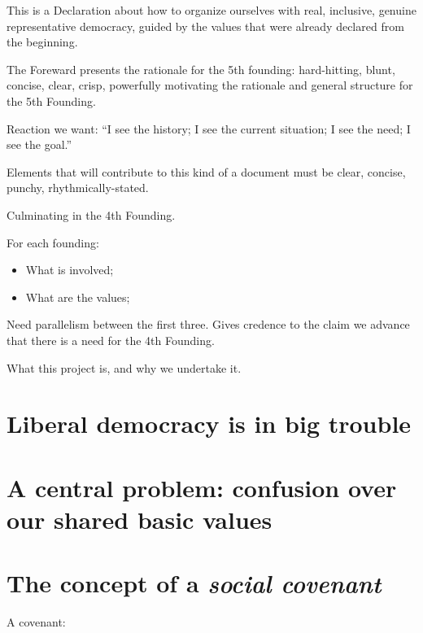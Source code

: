 \documentclass[
]{book}
\providecommand{\tightlist}{%
  \setlength{\itemsep}{0pt}\setlength{\parskip}{0pt}}
\begin{document}
This is a Declaration about how to organize ourselves with real, inclusive, genuine representative democracy, guided by the values that were already declared from the beginning.

The Foreward presents the rationale for the 5th founding: hard-hitting, blunt, concise, clear, crisp, powerfully motivating the rationale and general structure for the 5th Founding.

Reaction we want: ``I see the history; I see the current situation; I see the need; I see the goal.''

Elements that will contribute to this kind of a document must be clear, concise, punchy, rhythmically-stated.

Culminating in the 4th Founding.

For each founding:

\begin{itemize}
\tightlist
\item
  What is involved;
\item
  What are the values;
\end{itemize}

Need parallelism between the first three. Gives credence to the claim we advance that there is a need for the 4th Founding.

What this project is, and why we undertake it.

\hypertarget{liberal-democracy-is-in-big-trouble}{%
\section{Liberal democracy is in big trouble}\label{liberal-democracy-is-in-big-trouble}}

\hypertarget{a-central-problem-confusion-over-our-shared-basic-values}{%
\section{A central problem: confusion over our shared basic values}\label{a-central-problem-confusion-over-our-shared-basic-values}}

\hypertarget{the-concept-of-a-social-covenant}{%
\section{\texorpdfstring{The concept of a \emph{social covenant}}{The concept of a social covenant}}\label{the-concept-of-a-social-covenant}}

A covenant:
\end{document}
